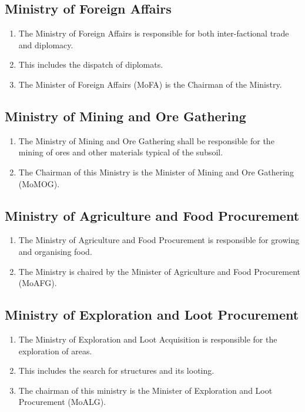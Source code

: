 \documentclass{article}
\begin{document}
\subsection{Ministry of Foreign Affairs}
\begin{enumerate}[(1)]
    \item The Ministry of Foreign Affairs is responsible for both inter-factional trade and diplomacy.
    \item This includes the dispatch of diplomats.
    \item The Minister of Foreign Affairs (MoFA) is the Chairman of the Ministry.
\end{enumerate}

\subsection{Ministry of Mining and Ore Gathering}
\begin{enumerate}[(1)]
    \item The Ministry of Mining and Ore Gathering shall be responsible for the mining of ores and other materials typical of the subsoil.
    \item The Chairman of this Ministry is the Minister of Mining and Ore Gathering (MoMOG).
\end{enumerate}

\subsection{Ministry of Agriculture and Food Procurement}
\begin{enumerate}[(1)]
    \item The Ministry of Agriculture and Food Procurement is responsible for growing and organising food.
    \item The Ministry is chaired by the Minister of Agriculture and Food Procurement (MoAFG).
\end{enumerate}

\subsection{Ministry of Exploration and Loot Procurement}
\begin{enumerate}[(1)]
    \item The Ministry of Exploration and Loot Acquisition is responsible for the exploration of areas.
    \item This includes the search for structures and its looting.
    \item The chairman of this ministry is the Minister of Exploration and Loot Procurement (MoALG).
\end{enumerate}
\end{document}
